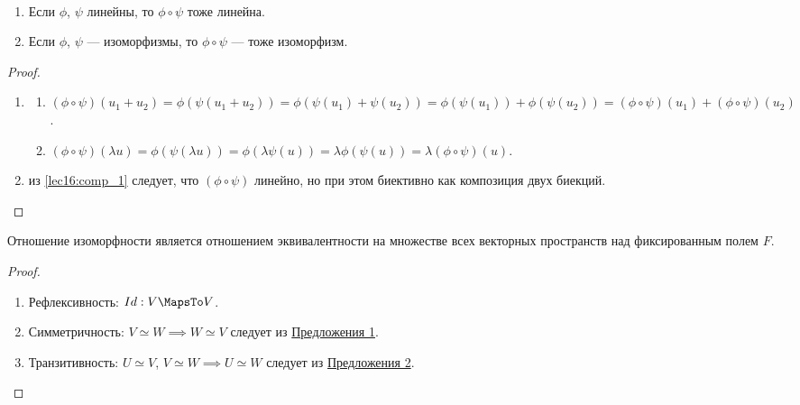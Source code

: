 \documentclass[a4paper]{article}
\begin{document}
\begin{colloq}
            \begin{proposal}~
                \label{lec16:prop_2}
                \begin{enumerate}[nosep]
                \item Если $\phi$, $\psi$ линейны, то $\phi \circ \psi$ тоже линейна.
                \item Если $\phi$, $\psi$ --- изоморфизмы, то $\phi \circ \psi$ --- тоже изоморфизм.
                \end{enumerate}
            \end{proposal}

            \begin{proof}~
                \begin{enumerate}
                \item \label{lec16:comp_1}
                    \begin{enumerate}[label=(\arabic*)]
                        \item $(\phi \circ \psi)(u_1 + u_2) = \phi(\psi(u_1 + u_2)) = \phi(\psi(u_1) + \psi(u_2)) = \phi(\psi(u_1)) + \phi(\psi(u_2)) = (\phi \circ \psi)(u_1) + (\phi \circ \psi)(u_2)$.
                        \item $(\phi \circ \psi)(\lambda u) = \phi(\psi(\lambda u)) = \phi(\lambda \psi(u)) = \lambda \phi(\psi(u)) = \lambda(\phi \circ \psi)(u)$.
                    \end{enumerate}
                \item из \ref{lec16:comp_1} следует, что $(\phi \circ \psi)$ линейно, но при этом биективно как композиция двух биекций.
                    \qedhere
                \end{enumerate}
            \end{proof}

            \bigskip
            \begin{theorem}
                Отношение изоморфности является отношением эквивалентности на множестве всех векторных пространств над фиксированным полем $F$.
            \end{theorem}

            \begin{proof}~
                \begin{enumerate}
                \item Рефлексивность: $Id: V \MapsTo V$.
                \item Симметричность: $V \simeq W \implies W \simeq V$ следует из \hyperref[lec16:prop_1]{Предложения 1}.
                \item Транзитивность: $U \simeq V$, $V \simeq W \implies U \simeq W$ следует из \hyperref[lec16:prop_2]{Предложения 2}.
                    \qedhere
                \end{enumerate}
            \end{proof}



\end{colloq}
\end{document}
